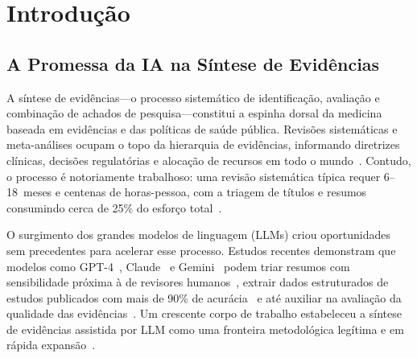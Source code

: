 \documentclass[12pt, a4paper]{article}
\begin{document}
\begin{abstract}
\noindent\textbf{Conclusões.}
O não-determinismo dos LLMs representa uma ameaça concreta à reprodutibilidade da síntese de evidências, desde a extração de estudos individuais até as conclusões meta-analíticas agregadas.
Pesquisadores que utilizam LLMs em nuvem devem esperar variação significativa nas saídas mesmo sob configurações ``determinísticas'' e adotar protocolos de rastreamento de proveniência para documentar e mitigar essa instabilidade.

\vspace{6pt}
\noindent\textbf{Palavras-chave:} reprodutibilidade, grandes modelos de linguagem, síntese de evidências, revisão sistemática, não-determinismo, PM\textsubscript{2.5}, triagem, extração de dados

\noindent\textbf{Keywords:} reproducibility, large language models, evidence synthesis, systematic review, non-determinism, PM\textsubscript{2.5}, screening, data extraction
\end{abstract}

\clearpage
\tableofcontents
\clearpage

\section{Introdução}

\subsection{A Promessa da IA na Síntese de Evidências}

A síntese de evidências---o processo sistemático de identificação, avaliação e combinação de achados de pesquisa---constitui a espinha dorsal da medicina baseada em evidências e das políticas de saúde pública.
Revisões sistemáticas e meta-análises ocupam o topo da hierarquia de evidências, informando diretrizes clínicas, decisões regulatórias e alocação de recursos em todo o mundo~\citep{higgins2019cochrane, page2021prisma}.
Contudo, o processo é notoriamente trabalhoso: uma revisão sistemática típica requer 6--18~meses e centenas de horas-pessoa, com a triagem de títulos e resumos consumindo cerca de 25\% do esforço total~\citep{borah2017analysis}.

O surgimento dos grandes modelos de linguagem (LLMs) criou oportunidades sem precedentes para acelerar esse processo.
Estudos recentes demonstram que modelos como GPT-4~\citep{openai2023gpt4}, Claude~\citep{anthropic2024claude} e Gemini~\citep{geminiteam2024gemini} podem triar resumos com sensibilidade próxima à de revisores humanos~\citep{oami2024screening, khraisha2024gpt4}, extrair dados estruturados de estudos publicados com mais de 90\% de acurácia~\citep{gartlehner2024extraction, jensen2025chatgpt} e até auxiliar na avaliação da qualidade das evidências~\citep{wang2025trialmind, li2025streamlining}.
Um crescente corpo de trabalho estabeleceu a síntese de evidências assistida por LLM como uma fronteira metodológica legítima e em rápida expansão~\citep{li2025jamia, scherbakov2025jamia, matsui2024screening}.
\end{document}
